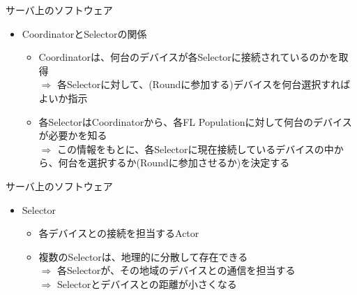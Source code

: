 \documentclass[dvipdfmx,notheorems,t]{beamer}
\begin{document}
\begin{frame}{サーバ上のソフトウェア}

\begin{itemize}
	\item \alert{Coordinator}と\alert{Selector}の関係
	\begin{itemize}
		\item Coordinatorは、何台のデバイスが各Selectorに接続されているのかを取得 \\
		$\Rightarrow$ 各Selectorに対して、(Roundに参加する)デバイスを何台選択すればよいか指示
		\newline
		
		\item 各SelectorはCoordinatorから、各FL Populationに対して何台のデバイスが必要かを知る \\
		$\Rightarrow$ この情報をもとに、各Selectorに現在接続しているデバイスの中から、何台を選択するか(Roundに参加させるか)を決定する
	\end{itemize}
\end{itemize}

\end{frame}

\begin{frame}{サーバ上のソフトウェア}

\begin{itemize} 
	\item \alert{Selector}
	\begin{itemize}
		\item 各デバイスとの接続を担当するActor
		\newline
		
		\item 複数のSelectorは、地理的に分散して存在できる \\
		$\Rightarrow$ 各Selectorが、その地域のデバイスとの通信を担当する \\
		$\Rightarrow$ Selectorとデバイスとの距離が小さくなる
	\end{itemize}
\end{itemize}

\end{frame}
\end{document}

